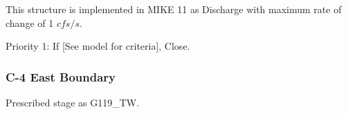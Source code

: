 This structure is implemented in MIKE 11 as Discharge with maximum rate of change of 1 $cfs/s$.

\begin{packed_items}
\item Priority 1: If \textcolor[rgb]{1.00,0.00,0.00}{[See model for criteria]}, Close.
\end{packed_items}


%
%



\clearpage

\subsubsection{C-4 East Boundary}

Prescribed stage as G119\_TW.

